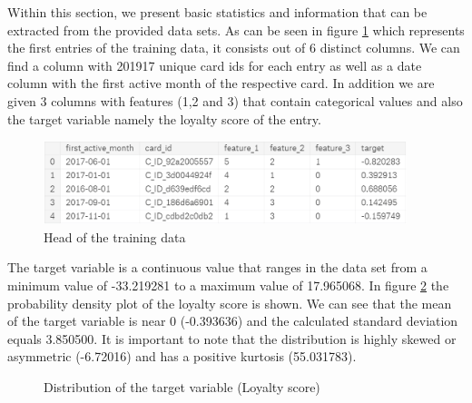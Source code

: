 \documentclass{article}
\begin{document}

Within this section, we present basic statistics and information that can be extracted from the provided data sets. As can be seen in figure \ref{fig:train_head} which represents the first entries of the training data, it consists out of 6 distinct columns. We can find a column with 201917 unique card ids for each entry as well as a date column with the first active month of the respective card. In addition we are given 3 columns with features (1,2 and 3) that contain categorical values and also the target variable namely the loyalty score of the entry.

\begin{figure}[h]
  \centering
  \includegraphics[width=300pt]{train_head}
  \caption{Head of the training data}
  \label{fig:train_head}
\end{figure}

The target variable is a continuous value that ranges in the data set from a minimum value of -33.219281 to a maximum value of 17.965068. In figure \ref{fig:distplot_target} the probability density plot of the loyalty score is shown. We can see that the mean of the target variable is near 0 (-0.393636) and the calculated standard deviation equals 3.850500. It is important to note that the distribution is highly skewed or asymmetric (-6.72016) and has a positive kurtosis (55.031783).

\begin{figure}[h]
  \centering
  
  \caption{Distribution of the target variable (Loyalty score)}
  \label{fig:distplot_target}
\end{figure}
\end{document}
